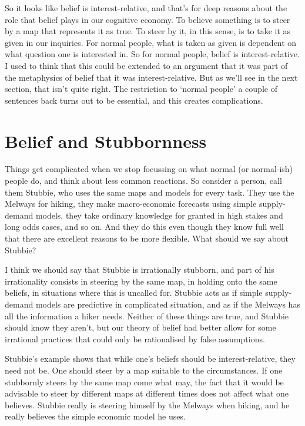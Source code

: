 \documentclass[
  10pt,
  letterpaper,
  twoside]{scrbook}
\begin{document}
So it looks like belief is interest-relative, and that's for deep
reasons about the role that belief plays in our cognitive economy. To
believe something is to steer by a map that represents it as true. To
steer by it, in this sense, is to take it as given in our inquiries. For
normal people, what is taken as given is dependent on what question one
is interested in. So for normal people, belief is interest-relative. I
used to think that this could be extended to an argument that it was
part of the metaphysics of belief that it was interest-relative. But as
we'll see in the next section, that isn't quite right. The restriction
to `normal people' a couple of sentences back turns out to be essential,
and this creates complications.

\section{Belief and Stubbornness}\label{sec-stubbie}

Things get complicated when we stop focussing on what normal (or
normal-ish) people do, and think about less common reactions. So
consider a person, call them Stubbie, who uses the same maps and models
for every task. They use the Melways for hiking, they make
macro-economic forecasts using simple supply-demand models, they take
ordinary knowledge for granted in high stakes and long odds cases, and
so on. And they do this even though they know full well that there are
excellent reasons to be more flexible. What should we say about Stubbie?

I think we should say that Stubbie is irrationally stubborn, and part of
his irrationality consists in steering by the same map, in holding onto
the same beliefs, in situations where this is uncalled for. Stubbie acts
as if simple supply-demand models are predictive in complicated
situation, and as if the Melways has all the information a hiker needs.
Neither of these things are true, and Stubbie should know they aren't,
but our theory of belief had better allow for some irrational practices
that could only be rationalised by false assumptions.

Stubbie's example shows that while one's beliefs should be
interest-relative, they need not be. One should steer by a map suitable
to the circumstances. If one stubbornly steers by the same map come what
may, the fact that it would be advisable to steer by different maps at
different times does not affect what one believes. Stubbie really is
steering himself by the Melways when hiking, and he really believes the
simple economic model he uses.
\end{document}
